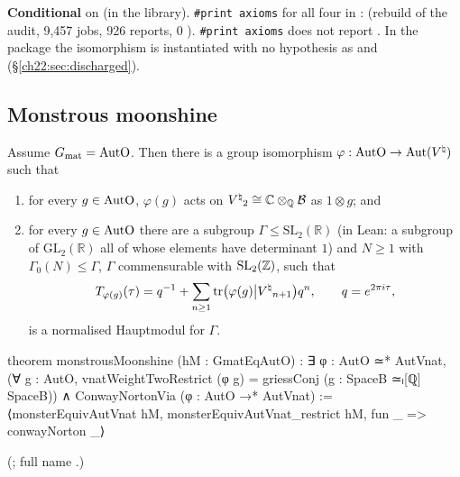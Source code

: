 \begin{status}
\textbf{Conditional} on  (in the library).  \texttt{\#print axioms} for all four in :
 (rebuild of the audit, 9,457 jobs, 926 reports, $0$ ).  \texttt{\#print axioms} does not report .
In the package  the isomorphism is instantiated with no hypothesis as  and
 (\S\ref{ch22:sec:discharged}).
\end{status}

\subsection{Monstrous moonshine}

\begin{theorem}\label{ch22:thm:monstrous}
Assume $G_{\mathrm{mat}}=\mathrm{AutO}$.  Then there is a group isomorphism $\varphi:\mathrm{AutO}\to\operatorname{Aut}({V^{\natural}})$ such that
\begin{enumerate}[label=(\roman*)]
\item for every $g\in\mathrm{AutO}$, $\varphi(g)$ acts on ${V^{\natural}}_2\cong{\mathbb{C}}\otimes_{\mathbb{Q}}\mathcal{B}$ as $1\otimes g$; and
\item for every $g\in\mathrm{AutO}$ there are a subgroup $\Gamma\le\mathrm{SL}_2(\mathbb{R})$ (in Lean: a subgroup of
  $\mathrm{GL}_2(\mathbb{R})$ all of whose elements have determinant $1$) and $N\ge1$ with $\Gamma_0(N)\le\Gamma$, $\Gamma$ commensurable with $\mathrm{SL}_2({\mathbb{Z}})$, such that
  \begin{equation*}
    T_{\varphi(g)}(\tau)=q^{-1}+\sum_{n\ge1}\operatorname{tr}\bigl(\varphi(g)\big|{V^{\natural}}_{n+1}\bigr)q^n,\qquad q=e^{2\pi i\tau},
  \end{equation*}
  is a normalised Hauptmodul for $\Gamma$.
\end{enumerate}
\end{theorem}
\begin{leancode}
theorem monstrousMoonshine (hM : GmatEqAutO) :
    ∃ φ : AutO ≃* AutVnat,
      (∀ g : AutO, vnatWeightTwoRestrict (φ g) = griessConj (g : SpaceB ≃ₗ[ℚ] SpaceB)) ∧
        ConwayNortonVia (φ : AutO →* AutVnat) :=
  ⟨monsterEquivAutVnat hM, monsterEquivAutVnat_restrict hM, fun _ => conwayNorton _⟩
\end{leancode}
(; full name .)

